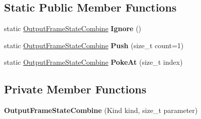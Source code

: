 \subsection*{Static Public Member Functions}
\begin{DoxyCompactItemize}
\item 
static \hyperlink{classv8_1_1internal_1_1compiler_1_1_output_frame_state_combine}{Output\+Frame\+State\+Combine} {\bfseries Ignore} ()\hypertarget{classv8_1_1internal_1_1compiler_1_1_output_frame_state_combine_a82c3d7fa1b78d93ef43cfd66db320b71}{}\label{classv8_1_1internal_1_1compiler_1_1_output_frame_state_combine_a82c3d7fa1b78d93ef43cfd66db320b71}

\item 
static \hyperlink{classv8_1_1internal_1_1compiler_1_1_output_frame_state_combine}{Output\+Frame\+State\+Combine} {\bfseries Push} (size\+\_\+t count=1)\hypertarget{classv8_1_1internal_1_1compiler_1_1_output_frame_state_combine_a1326ac0e495b55bb3666a7c8d57c6fdd}{}\label{classv8_1_1internal_1_1compiler_1_1_output_frame_state_combine_a1326ac0e495b55bb3666a7c8d57c6fdd}

\item 
static \hyperlink{classv8_1_1internal_1_1compiler_1_1_output_frame_state_combine}{Output\+Frame\+State\+Combine} {\bfseries Poke\+At} (size\+\_\+t index)\hypertarget{classv8_1_1internal_1_1compiler_1_1_output_frame_state_combine_a5d1eb7b7ed10db905db627650485f683}{}\label{classv8_1_1internal_1_1compiler_1_1_output_frame_state_combine_a5d1eb7b7ed10db905db627650485f683}

\end{DoxyCompactItemize}
\subsection*{Private Member Functions}
\begin{DoxyCompactItemize}
\item 
{\bfseries Output\+Frame\+State\+Combine} (Kind kind, size\+\_\+t parameter)\hypertarget{classv8_1_1internal_1_1compiler_1_1_output_frame_state_combine_a97add8a32b3207df0aec0f4552861026}{}\label{classv8_1_1internal_1_1compiler_1_1_output_frame_state_combine_a97add8a32b3207df0aec0f4552861026}

\end{DoxyCompactItemize}
